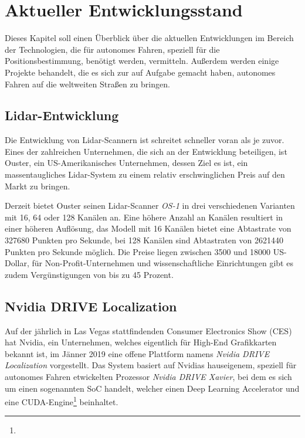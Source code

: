 \chapter{Aktueller Entwicklungsstand}

Dieses Kapitel soll einen Überblick über die aktuellen Entwicklungen im Bereich der Technologien, die für autonomes Fahren, speziell für die Positionsbestimmung, benötigt werden, vermitteln. Außerdem werden einige Projekte behandelt, die es sich zur auf Aufgabe gemacht haben, autonomes Fahren auf die weltweiten Straßen zu bringen.


\section{\acs{Lidar}-Entwicklung}

Die Entwicklung von Lidar-Scannern ist schreitet schneller voran als je zuvor. Eines der zahlreichen Unternehmen, die sich an der Entwicklung beteiligen, ist Ouster, ein US-Amerikanisches Unternehmen, dessen Ziel es ist, ein massentaugliches Lidar-System zu einem relativ erschwinglichen Preis auf den Markt zu bringen. 

Derzeit bietet Ouster seinen \acs{Lidar}-Scanner \emph{OS-1} in drei verschiedenen Varianten mit 16, 64 oder 128 Kanälen an. Eine höhere Anzahl an Kanälen resultiert in einer höheren Auflösung, das Modell mit 16 Kanälen bietet eine Abtastrate von \num{327680} Punkten pro Sekunde, bei 128 Kanälen sind Abtastraten von \num{2621440} Punkten pro Sekunde möglich. Die Preise liegen zwischen \num{3500} und \num{18000} US-Dollar, für Non-Profit-Unternehmen und wissenschaftliche Einrichtungen gibt es zudem Vergünstigungen von bis zu 45 Prozent. 


\section{Nvidia DRIVE Localization}

Auf der jährlich in Las Vegas stattfindenden Consumer Electronics Show (CES) hat Nvidia, ein Unternehmen, welches eigentlich für High-End Grafikkarten bekannt ist, im Jänner 2019 eine offene Plattform namens \emph{Nvidia DRIVE Localization} vorgestellt. Das System basiert auf Nvidias hauseigenem, speziell für autonomes Fahren etwickelten Prozessor \emph{Nvidia DRIVE Xavier}, bei dem es sich um einen sogenannten \ac{SoC} handelt, welcher einen Deep Learning Accelerator und eine CUDA-Engine\footnote{} beinhaltet. 

